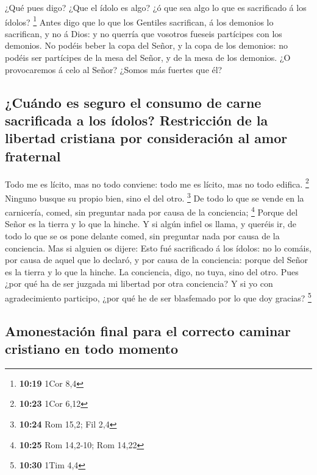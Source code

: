  ¿Qué pues digo? ¿Que el ídolo es algo? ¿ó que sea algo
lo que es sacrificado á los ídolos? \footnote{\textbf{10:19} 1Cor 8,4}
 Antes digo que lo que los Gentiles sacrifican, á los
demonios lo sacrifican, y no á Dios: y no querría que vosotros fueseis
partícipes con los demonios.  No podéis beber la copa del
Señor, y la copa de los demonios: no podéis ser partícipes de la mesa
del Señor, y de la mesa de los demonios.  ¿O provocaremos
á celo al Señor? ¿Somos más fuertes que él?

\hypertarget{cuuxe1ndo-es-seguro-el-consumo-de-carne-sacrificada-a-los-uxeddolos-restricciuxf3n-de-la-libertad-cristiana-por-consideraciuxf3n-al-amor-fraternal}{%
\subsection{¿Cuándo es seguro el consumo de carne sacrificada a los
ídolos? Restricción de la libertad cristiana por consideración al amor
fraternal}\label{cuuxe1ndo-es-seguro-el-consumo-de-carne-sacrificada-a-los-uxeddolos-restricciuxf3n-de-la-libertad-cristiana-por-consideraciuxf3n-al-amor-fraternal}}

 Todo me es lícito, mas no todo conviene: todo me es
lícito, mas no todo edifica. \footnote{\textbf{10:23} 1Cor 6,12}
 Ninguno busque su propio bien, sino el del otro.
\footnote{\textbf{10:24} Rom 15,2; Fil 2,4}  De todo lo
que se vende en la carnicería, comed, sin preguntar nada por causa de la
conciencia; \footnote{\textbf{10:25} Rom 14,2-10; Rom 14,22}
 Porque del Señor es la tierra y lo que la hinche.
 Y si algún infiel os llama, y queréis ir, de todo lo que
se os pone delante comed, sin preguntar nada por causa de la conciencia.
 Mas si alguien os dijere: Esto fué sacrificado á los
ídolos: no lo comáis, por causa de aquel que lo declaró, y por causa de
la conciencia: porque del Señor es la tierra y lo que la hinche.
 La conciencia, digo, no tuya, sino del otro. Pues ¿por
qué ha de ser juzgada mi libertad por otra conciencia?  Y
si yo con agradecimiento participo, ¿por qué he de ser blasfemado por lo
que doy gracias? \footnote{\textbf{10:30} 1Tim 4,4}

\hypertarget{amonestaciuxf3n-final-para-el-correcto-caminar-cristiano-en-todo-momento}{%
\subsection{Amonestación final para el correcto caminar cristiano en
todo
momento}\label{amonestaciuxf3n-final-para-el-correcto-caminar-cristiano-en-todo-momento}}

